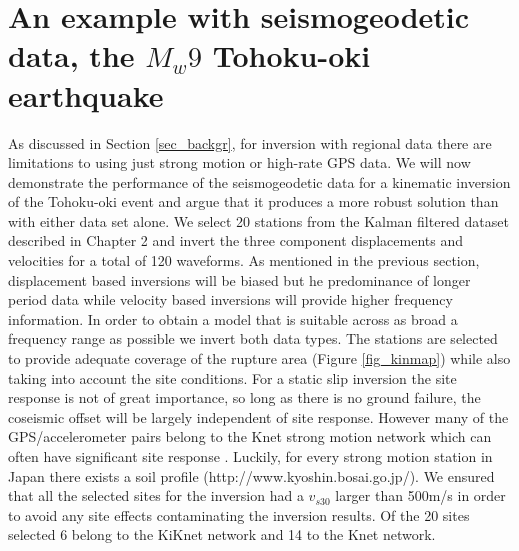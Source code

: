 \section{An example with seismogeodetic data, the $M_w9$ Tohoku-oki earthquake}

As discussed in Section \ref{sec_backgr}, for inversion with regional data there are limitations to using just strong motion or high-rate GPS data. We will now demonstrate the performance of the seismogeodetic data for a kinematic inversion of the Tohoku-oki event and argue that it produces a more robust solution than with either data set alone. We select 20 stations from the Kalman filtered dataset described in Chapter 2 and invert the three component displacements and velocities for a total of 120 waveforms. As mentioned in the previous section, displacement based inversions will be biased but he predominance of longer period data while velocity based inversions will provide higher frequency information. In order to obtain a model that is suitable across as broad a frequency range as possible we invert both data types. The stations are selected to provide adequate coverage of the rupture area (Figure \ref{fig_kinmap}) while also taking into account the site conditions. For a static slip inversion the site response is not of great importance, so long as there is no ground failure, the coseismic offset will be largely independent of site response. However many of the GPS/accelerometer pairs belong to the Knet strong motion network which can often have significant site response \citep{tsuda2006}. Luckily, for every strong motion station in Japan there exists a soil profile (http://www.kyoshin.bosai.go.jp/). We ensured that all the selected sites for the inversion had a $v_{s30}$ larger than 500m/s in order to avoid any site effects contaminating the inversion results. Of the 20 sites selected 6 belong to the KiKnet network and 14 to the Knet network.

